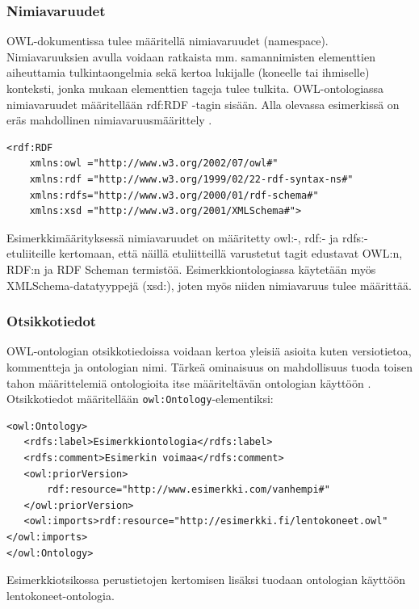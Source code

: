 \documentclass[finnish]{tktltiki2}
\theoremstyle{definition}
\theoremstyle{remark}
\begin{document}
\subsubsection{Nimiavaruudet}
OWL-dokumentissa tulee määritellä nimiavaruudet (namespace). Nimiavaruuksien
avulla voidaan ratkaista mm. samannimisten elementtien aiheuttamia
tulkintaongelmia sekä kertoa lukijalle (koneelle tai ihmiselle) konteksti, jonka
mukaan elementtien tageja tulee tulkita. OWL-ontologiassa nimiavaruudet
määritellään rdf:RDF -tagin sisään.  Alla olevassa esimerkissä on eräs mahdollinen nimiavaruusmäärittely . 
\begin{verbatim}
<rdf:RDF
    xmlns:owl ="http://www.w3.org/2002/07/owl#"
    xmlns:rdf ="http://www.w3.org/1999/02/22-rdf-syntax-ns#"
    xmlns:rdfs="http://www.w3.org/2000/01/rdf-schema#"
    xmlns:xsd ="http://www.w3.org/2001/XMLSchema#">
\end{verbatim}
Esimerkkimäärityksessä nimiavaruudet on määritetty owl:-, rdf:- ja rdfs:-etuliiteille kertomaan, että näillä
etuliitteillä varustetut tagit edustavat OWL:n, RDF:n ja RDF Scheman termistöä.
Esimerkkiontologiassa käytetään myös XMLSchema-datatyyppejä (xsd:), joten myös niiden
nimiavaruus tulee määrittää. 

\subsubsection{Otsikkotiedot}
OWL-ontologian otsikkotiedoissa voidaan kertoa yleisiä asioita kuten versiotietoa, kommentteja ja ontologian nimi. Tärkeä ominaisuus on mahdollisuus tuoda toisen tahon määrittelemiä ontologioita itse määriteltävän ontologian käyttöön \cite{SWM04}. Otsikkotiedot määritellään \texttt{owl:Ontology}-elementiksi: 
\begin{verbatim}
<owl:Ontology>
   <rdfs:label>Esimerkkiontologia</rdfs:label>
   <rdfs:comment>Esimerkin voimaa</rdfs:comment>
   <owl:priorVersion>
       rdf:resource="http://www.esimerkki.com/vanhempi#"
   </owl:priorVersion>
   <owl:imports>rdf:resource="http://esimerkki.fi/lentokoneet.owl"</owl:imports>
</owl:Ontology>
\end{verbatim}
Esimerkkiotsikossa perustietojen kertomisen lisäksi tuodaan ontologian käyttöön lentokoneet-ontologia. 
\end{document}
